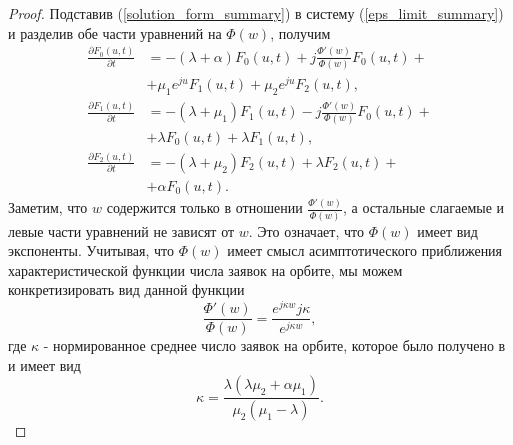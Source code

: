 \begin{proof}
	Подставив (\ref{solution_form_summary}) в систему (\ref{eps_limit_summary}) и разделив обе части уравнений на $\Phi(w)$, получим
	\begin{equation} \label{preresult_summary}
		\begin{split}
			\frac{{\partial F_{0}(u,t)}}{{\partial t}} &= -(\lambda + \alpha)F_{0}(u,t) + j
			\frac{\Phi'(w) }{\Phi(w)}F_{0}(u,t) +\\  &+ \mu_{1} e^{ju}F_{1}(u,t) + \mu_{2}e^{ju}F_{2}(u,t) ,
			\\
			\frac{{\partial F_{1}(u,t)}}{{\partial t}} &= -(\lambda + \mu_{1})F_{1}(u,t) - j 
			\frac{\Phi'(w) }{\Phi(w)}F_{0}(u,t) +\\  &+ \lambda F_{0}(u,t) + \lambda F_{1}(u,t) ,
			\\
			\frac{{\partial F_{2}(u,t)}}{{\partial t}} &= -(\lambda + \mu_{2})F_{2}(u,t)  + \lambda F_{2}(u,t) +\\  &+ \alpha F_{0}(u,t).
		\end{split}
	\end{equation}  
	Заметим, что $w$ содержится только в отношении $\frac{\Phi'(w) }{\Phi(w)}$, а остальные слагаемые и левые части уравнений не зависят от $w$. Это означает, что  $\Phi(w)$ имеет вид экспоненты. Учитывая, что  $\Phi(w)$ имеет смысл асимптотического приближения характеристической функции числа заявок на орбите, мы можем конкретизировать вид данной функции
	\begin{equation} \label{Phi_concrete}
		\frac{\Phi'(w) }{\Phi(w)} = \frac{e^{j\kappa w}j\kappa}{e^{j\kappa w}},
	\end{equation} 
	где $\kappa$ - нормированное среднее число заявок на орбите, которое было получено в \cite{nazarov2017asymptotic} и имеет вид 
	\begin{equation*}
		\kappa = \frac{\lambda(\lambda \mu_{2} + \alpha \mu_{1})}{\mu_{2}(\mu_{1} - \lambda)}.
	\end{equation*}
	

\end{proof}
